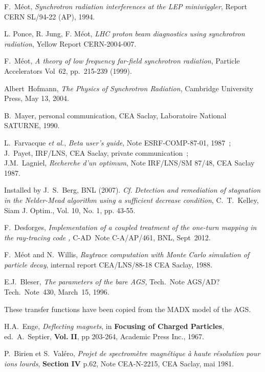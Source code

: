 \begin{thebibliography}{99}
F.~M\'eot, 
\textsl{Synchrotron radiation interferences at the LEP miniwiggler}, 
Report CERN SL/94-22 (AP), 1994. 

L. Ponce,  R. Jung, F. M\'eot, 
\textsl{LHC proton beam diagnostics using synchrotron radiation},  
Yellow Report CERN-2004-007. 

F.~M\'eot, 
\textsl{A theory of low frequency far-field synchrotron radiation}, 
 Particle Accelerators Vol~62, pp.~215-239  (1999). 

Albert~Hofmann, 
\textsl{The Physics of Synchrotron Radiation}, 
Cambridge University Press, May 13, 2004. 

 B.~Mayer, personal communication,
CEA Saclay, Laboratoire National SATURNE, 1990. 

L.~Farvacque \textsl{et al.}, 
\textsl{Beta user's guide}, 
Note ESRF-COMP-87-01, 1987~; \\
J.~Payet, IRF/LNS, CEA Saclay, private communication~; \\
J.M.~Lagniel, 
\textsl{Recherche d'un optimum}, 
Note IRF/LNS/SM 87/48, CEA Saclay 1987.

Installed by J.~S.~Berg, BNL (2007). 
\emph{Cf.} \textsl{Detection and remediation of stagnation in the 
Nelder-Mead algorithm using a sufficient decrease condition}, 
  C.~T.~Kelley, Siam J. Optim., Vol. 10, No. 1, pp. 43-55. 

F.~Desforges, 
\textsl{Implementation of a coupled treatment of the one-turn mapping in the ray-tracing code \zgoubi, }
C-AD~Note C-A/AP/461, BNL, Sept~2012.

F.~M\'eot and N.~Willis, 
\textsl{Raytrace computation with Monte Carlo simulation of particle decay}, 
internal report CEA/LNS/88-18 CEA Saclay, 1988. 

E.J.~Bleser, 
\textsl{The parameters of the bare AGS,}
 Tech.~Note AGS/AD?Tech.~Note~430, March~15, 1996.

 These transfer functions have been copied from the MADX model of the AGS.

H.A.~Enge, 
\textsl{Deflecting magnets}, in \textbf{Focusing of Charged Particles}, 
ed.~A.~Septier, \textbf{Vol.}  \textbf{II}, pp 203-264, Academic
Press Inc., 1967.

P.~Birien et S.~Val\'ero, 
\textsl{Projet de spectrom\`etre magn\'etique \`a haute r\'esolution pour ions lourds}, 
\textbf{Section IV} p.62, Note CEA-N-2215, CEA Saclay, mai 1981.




\end{thebibliography}
